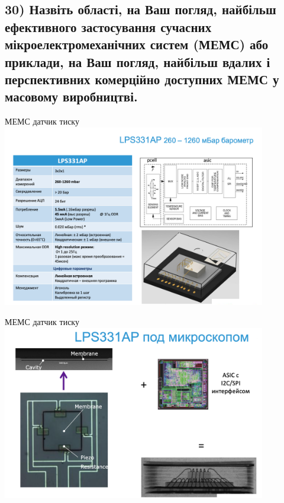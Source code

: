 \documentclass{beamer}
\begin{document}
  
  
  
  
  
  
  
  
  \begin{frame}
  \section
  {30) \small{Назвіть області, на Ваш погляд, найбільш ефективного застосування сучасних мікроелектромеханічних систем (МЕМС) або приклади, на Ваш погляд, найбільш вдалих і перспективних комерційно доступних МЕМС у масовому виробництві. 
 }}
\end{frame}
  
  
  
  
  
  
  \begin{frame}{МЕМС датчик тиску}
 \includegraphics[width=11.5cm]{davl.png}\\ 

  {\small{ }}
\end{frame}

  
   \begin{frame}{МЕМС датчик тиску}
 \includegraphics[width=11.5cm]{davl1.png}\\ 

  {\small{ }}
\end{frame}
\end{document}
